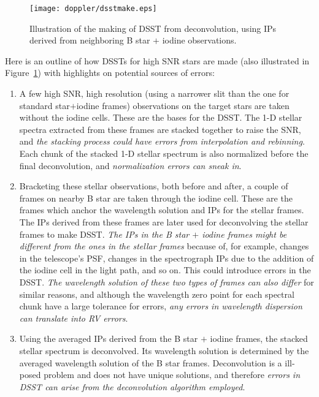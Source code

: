 \begin{figure}
\centering
\texttt{[image: doppler/dsstmake.eps]}
\caption{Illustration of the making of DSST from deconvolution, using
  IPs derived from neighboring B star $+$ iodine observations.
\label{doppler:fig:dsstmake}}
\end{figure}


Here is an outline of how DSSTs for high SNR stars are made (also
illustrated in Figure~\ref{doppler:fig:dsstmake}) with highlights on
potential sources of errors: 

\begin{enumerate}
\item A few high SNR, high resolution (using a narrower slit than
  the one for standard star$+$iodine frames) observations on the target
  stars are taken without the iodine cells. These are the bases for the
  DSST. The 1-D stellar spectra extracted from these frames are stacked
  together to raise the SNR, and {\em the stacking process could have errors
    from interpolation and rebinning}. Each chunk of the stacked 1-D
  stellar spectrum is also normalized before the final deconvolution,
  and {\em normalization errors can sneak in}.
\item Bracketing these stellar observations, both before and after,
  a couple of frames on nearby B star are taken through the iodine
  cell. These are the frames which anchor the wavelength solution
  and IPs for the stellar frames. The IPs derived from these frames
  are later used for deconvolving the stellar frames to make
  DSST. {\em The IPs in the B star $+$ iodine frames might be different from the
    ones in the stellar frames} because of, for example, changes in the
  telescope's PSF, changes in the spectrograph IPs due to the
  addition of the iodine cell in the light path, and so on. This
  could introduce errors in the DSST. {\em The wavelength solution of
    these two types of frames can also differ} for similar reasons, and
  although the wavelength zero point for each spectral chunk have a
  large tolerance for errors, {\em any errors in wavelength dispersion
  can translate into RV errors}.
\item Using the averaged IPs derived from the B star $+$ iodine
  frames, the stacked stellar spectrum is deconvolved. Its
  wavelength solution is determined by the averaged wavelength
  solution of the B star frames. Deconvolution is a ill-posed
  problem and does not have unique solutions, and therefore {\em errors
    in DSST can arise from the deconvolution algorithm employed}. 
\end{enumerate}

